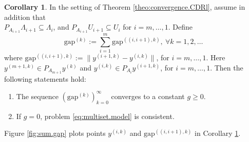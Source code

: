\documentclass[12pt]{article}
\theoremstyle{definition}
\newtheorem{corollary}{Corollary}
\begin{document}
\begin{corollary}\label{coro:conergence.gap}
In the setting of Theorem \ref{theo:convergence.CDRl}, assume in addition that\\
$P_{A_{i+1}}\Lambda_{i+1}\subseteq \Lambda_{i}$, and $P_{A_{i+1}}U_{i+1}\subseteq U_{i}$ for $i=m,\dots,1$.
Define
   \begin{equation}\label{eq:sum.gap}
    \mbox{gap}^{(k)}:=\sum_{i=1}^{m} \mbox{gap}^{((i,i+1),k)}, \ \forall k=1 ,2,\dots
\end{equation}
where $\mbox{gap}^{((i,i+1),k)}:= \|y^{(i+1,k)}-y^{(i,k)}\|$, for $i=m,\dots,1$.
Here $y^{(m+1,k)}\in P_{A_{m+1}} y^{(k)}$ and $y^{(i,k)}\in P_{A_i} y^{(i+1,k)}$, for $i=m,\dots,1$.
Then the following statements hold:
\begin{enumerate} 
    \item  
    The sequence $(\mbox{gap}^{(k)})_{k=0}^\infty$ converges to a constant $g\ge 0$.
    \item If $g=0$, problem \eqref{eq:multiset.model} is consistent.
\end{enumerate}
\end{corollary}
Figure \ref{fig:sum.gap} plots points $y^{(i,k)}$ and $\mbox{gap}^{((i,i+1),k)}$ in Corollary \ref{coro:conergence.gap}.
\end{document}
